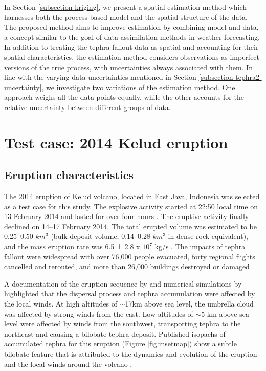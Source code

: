 In Section \ref{subsection-kriging}, we present a spatial estimation method which harnesses both the process-based model and the spatial structure of the data. The proposed method aims to improve estimation by combining model and data, a concept similar to the goal of data assimilation methods in weather forecasting. In addition to treating the tephra fallout data as spatial and accounting for their spatial characteristics, the estimation method considers observations as imperfect versions of the true process, with uncertainties always associated with them. In line with the varying data uncertainties mentioned in Section \ref{subsection-tephra2-uncertainty}, we investigate two variations of the estimation method. One approach weighs all the data points equally, while the other accounts for the relative uncertainty between different groups of data.


\section{Test case: 2014 Kelud eruption}\label{section-tephra2}

\subsection{Eruption characteristics}

The 2014 eruption of Kelud volcano, located in East Java, Indonesia was selected as a test case for this study. The explosive activity started at 22:50 local time on 13 February 2014 and lasted for over four hours \citep{global_volc}. The eruptive activity finally declined on 14–17 February 2014. The total erupted volume was estimated to be 0.25–0.50 $km^{3}$ (bulk deposit volume, 0.14–0.28 $km^{3}$ in dense rock equivalent), and the mass eruption rate was 6.5 ± 2.8 x $10^{7}$ kg/s \citep{MAENO201924}. The impacts of tephra fallout were widespread with over 76,000 people evacuated, forty regional flights cancelled and rerouted, and more than 26,000 buildings destroyed or damaged \citep{global_volc, williams2020, ifrc2014}. 

A documentation of the eruption sequence by \cite{MAENO201924} and numerical simulations by \cite{tanaka2016numerical} highlighted that the dispersal process and tephra accumulation were affected by the local winds. At high altitudes of $\sim$17km above sea level, the umbrella cloud was affected by strong winds from the east. Low altitudes of $\sim$5 km above sea level were affected by winds from the southwest, transporting tephra to the northeast and causing a bilobate tephra deposit. Published isopachs of accumulated tephra for this eruption (Figure \ref{fig:insetmap}) show a subtle bilobate feature that is attributed to the dynamics and evolution of the eruption and the local winds around the volcano \citep{MAENO201924}. 

